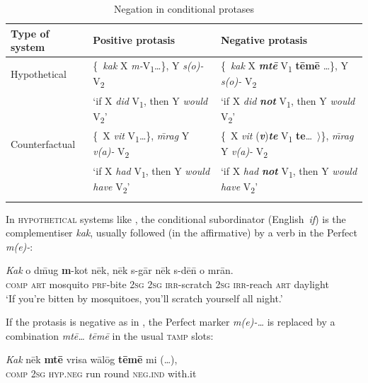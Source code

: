 \documentclass[output=paper,colorlinks,citecolor=brown,draft]{langscibook}
\begin{document}
\begin{table}\footnotesize 
\begin{tabularx}{\textwidth}{lll}
\lsptoprule
{Type of system} & {Positive protasis} & {Negative protasis}\\
\midrule 
{Hypothetical} & \{~\textit{kak}\textbf{ }X \textit{m-}V\textsubscript{1}…\}, Y \textit{s(o)-} V\textsubscript{2}  & \{~\textit{kak} X \textbf{\textit{mtē} }V\textsubscript{1} \textbf{\textbf{tēmē} }…\}, Y \textit{s(o)-} V\textsubscript{2}\\
& ‘if X \textit{did} V\textsubscript{1}, then Y \textit{would} V\textsubscript{2}’ & ‘if X \textit{did} \textbf{\textit{not}} V\textsubscript{1}, then Y \textit{would} V\textsubscript{2}’\\
{Counterfactual} & \{~X \textit{vit} V\textsubscript{1}…\}, \textit{\={m}rag} Y \textit{v(a)-} V\textsubscript{2} & \{~X \textit{vit}\textbf{ }(\textbf{\textit{v}})\textbf{\textit{te}} V\textsubscript{1}\textbf{ \textbf{te}}…~\textrm{${\rangle}$}\}, \textit{\={m}rag} Y \textit{v(a)-} V\textsubscript{2}\\
& ‘if X \textit{had} V\textsubscript{1}, then Y \textit{would have} V\textsubscript{2}’ & ‘if X \textit{had} \textbf{\textit{not}} V\textsubscript{1}, then Y \textit{would have} V\textsubscript{2}’\\
\lspbottomrule
\end{tabularx}
\caption{Negation in conditional protases}
\label{tab:dor:conditional}
\end{table}

In \textsc{hypothetical} systems like , the conditional subordinator (English~\textit{if}) is the complementiser \textit{kak}, usually followed (in the affirmative) by a verb in the Perfect \textit{m(e)-}:

\ea\label{ex:dor:mosquito} 
    \gll  \textit{Kak} o d\={m}ug \textbf{m}-kot nēk, nēk s-gār nēk  s-dē\={n} o mrān.\\ 
    \textsc{comp} \textsc{art} mosquito \textsc{prf-}bite \textsc{2sg} \textsc{2sg} \textsc{irr}-scratch \textsc{2sg} \textsc{irr}-reach \textsc{art} daylight\\
    \glt ‘If you’re bitten by mosquitoes, you’ll scratch yourself all night.’
\z 

If the protasis is negative as in , the Perfect marker \textit{m(e)-…} is replaced by a combination \textit{mtē… tēmē} in the usual \textsc{tamp} slots:

\newpage
\ea\label{ex:dor:ritual} 
    \gll  \textit{Kak} nēk \textbf{mtē} vrisa wālōg \textbf{tēmē} mi (…), \\
     \textsc{comp} \textsc{2sg} \textsc{hyp.neg} run round \textsc{neg.ind} with.it \\
     
\end{document}
